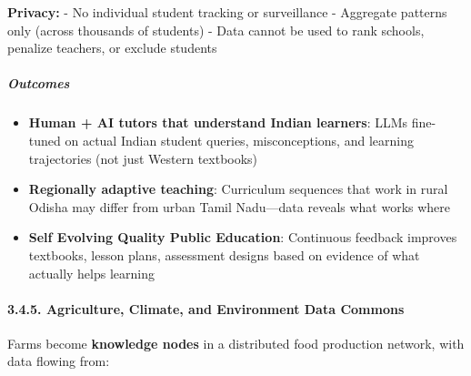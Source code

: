 \textbf{Privacy:} - No individual student tracking or surveillance -
Aggregate patterns only (across thousands of students) - Data cannot be
used to rank schools, penalize teachers, or exclude students

\subparagraph{Outcomes}\label{outcomes}

\begin{itemize}
\tightlist
\item
  \textbf{Human + AI tutors that understand Indian learners}: LLMs
  fine-tuned on actual Indian student queries, misconceptions, and
  learning trajectories (not just Western textbooks)
\item
  \textbf{Regionally adaptive teaching}: Curriculum sequences that work
  in rural Odisha may differ from urban Tamil Nadu---data reveals what
  works where
\item
  \textbf{Self Evolving Quality Public Education}: Continuous feedback
  improves textbooks, lesson plans, assessment designs based on evidence
  of what actually helps learning
\end{itemize}

\paragraph{3.4.5. Agriculture, Climate, and Environment Data
Commons}\label{agriculture-climate-and-environment-data-commons}

Farms become \textbf{knowledge nodes} in a distributed food production
network, with data flowing from:

